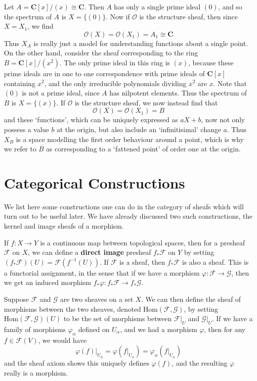\begin{example}
    Let $A = \mathbf{C}[x]/(x) \cong \mathbf{C}$. Then $A$ has only a single prime ideal $(0)$, and so the spectrum of $A$ is $X = \{ (0) \}$. Now if $\mathcal{O}$ is the structure sheaf, then since $X = X_1$, we find
    \[ \mathcal{O}(X) = \mathcal{O}(X_1) = A_1 \cong \mathbf{C} \]
    Thus $X_A$ is really just a model for understanding functions about a single point. On the other hand, consider the sheaf corresponding to the ring $B = \mathbf{C}[x]/(x^2)$. The only prime ideal in this ring is $(x)$, because these prime ideals are in one to one correspondence with prime ideals of $\mathbf{C}[x]$ containing $x^2$, and the only irreducible polynomials dividing $x^2$ are $x$. Note that $(0)$ is not a prime ideal, since $A$ has nilpotent elements. Thus the spectrum of $B$ is $X = \{ (x) \}$. If $\mathcal{O}$ is the structure sheaf, we now instead find that
    \[ \mathcal{O}(X) = \mathcal{O}(X_1) = B \]
    and these `functions', which can be uniquely expressed as $aX + b$, now not only possess a value $b$ at the origin, but also include an `infinitisimal' change $a$. Thus $X_B$ is a space modelling the first order behaviour around a point, which is why we refer to $B$ as corresponding to a `fattened point' of order one at the origin.
\end{example}

\section{Categorical Constructions}

We list here some constructions one can do in the category of sheafs which will turn out to be useful later. We have already discussed two such constructions, the kernel and image sheafs of a morphism.

\begin{example}
    If $f: X \to Y$ is a continuous map between topological spaces, then for a presheaf $\mathcal{F}$ on $X$, we can define a {\bf direct image} presheaf $f_* \mathcal{F}$ on $Y$ by setting $(f_* \mathcal{F})(U) = \mathcal{F}(f^{-1}(U))$. If $\mathcal{F}$ is a sheaf, then $f_* \mathcal{F}$ is also a sheaf. This is a functorial assignment, in the sense that if we have a morphism $\varphi: \mathcal{F} \to \mathcal{G}$, then we get an induced morphism $f_* \varphi: f_* \mathcal{F} \to f_* \mathcal{G}$.
\end{example}

Suppose $\mathcal{F}$ and $\mathcal{G}$ are two sheaves on a set $X$. We can then define the sheaf of morphisms between the two sheaves, denoted $\text{Hom}(\mathcal{F}, \mathcal{G})$, by setting $\text{Hom}(\mathcal{F}, \mathcal{G})(U)$ to be the set of morphisms between $\mathcal{F}|_U$ and $\mathcal{G}|_U$. If we have a family of morphisms $\varphi_\alpha$ defined on $U_\alpha$, and we had a morphism $\varphi$, then for any $f \in \mathcal{F}(V)$, we would have
%
\[ \varphi(f)|_{U_\alpha} = \varphi \left( f|_{U_\alpha} \right) = \varphi_\alpha \left( f|_{U_\alpha} \right) \]
%
and the sheaf axiom shows this uniquely defines $\varphi(f)$, and the resulting $\varphi$ really is a morphism.

